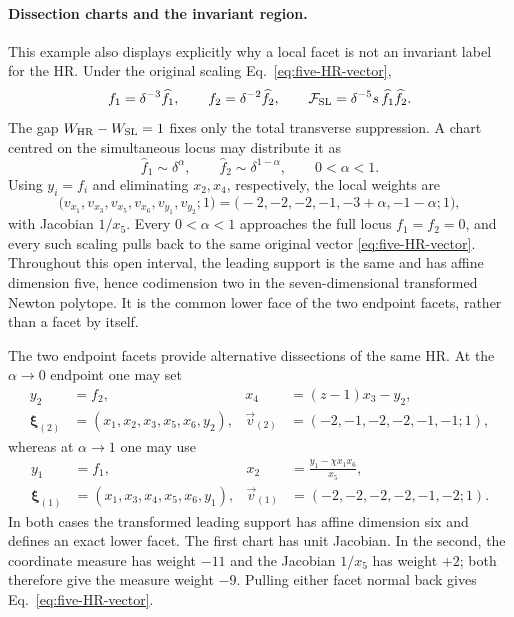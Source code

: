 \documentclass[a4paper,11pt]{article}
\newcommand{\FSL}{\mathcal F_{\rm SL}}
\newcommand{\WSL}{W_{\rm SL}}
\newcommand{\WHR}{W_{\rm HR}}
\begin{document}
\paragraph{Dissection charts and the invariant region.}
\label{sec:five-point-sc-charts}
This example also displays explicitly why a local facet is not an invariant
label for the HR.  Under the original scaling
Eq.~\eqref{eq:five-HR-vector},
\begin{equation}
 f_1=\delta^{-3}\widehat f_1,
 \qquad f_2=\delta^{-2}\widehat f_2,
 \qquad \FSL=\delta^{-5}s\,\widehat f_1\widehat f_2.
 \label{eq:five-sc-normalised-factors}
\end{equation}
The gap \(\WHR-\WSL=1\) fixes only the total transverse suppression.
A chart centred on the simultaneous locus may distribute it as
\begin{equation}
 \widehat f_1\sim\delta^\alpha,
 \qquad \widehat f_2\sim\delta^{1-\alpha},
 \qquad 0<\alpha<1.
 \label{eq:five-sc-dissection-family}
\end{equation}
Using \(y_i=f_i\) and eliminating \(x_2,x_4\), respectively, the local
weights are
\begin{equation}
 \bigl(v_{x_1},v_{x_3},v_{x_5},v_{x_6},v_{y_1},v_{y_2};1\bigr)
 =\bigl(-2,-2,-2,-1,-3+\alpha,-1-\alpha;1\bigr),
 \label{eq:five-sc-centred-chart}
\end{equation}
with Jacobian \(1/x_5\).  Every \(0<\alpha<1\) approaches the full locus
\(f_1=f_2=0\), and every such scaling pulls back to the same original vector
\eqref{eq:five-HR-vector}.  Throughout this open interval, the leading support
is the same and has affine dimension five, hence codimension two in the
seven-dimensional transformed Newton polytope.  It is the common lower face
of the two endpoint facets, rather than a facet by itself.

The two endpoint facets provide alternative dissections of the same HR.  At the
\(\alpha\to0\) endpoint one may set
\begin{equation}
 \begin{aligned}
  y_2&=f_2, & x_4&=(z-1)x_3-y_2,\\
  \boldsymbol\xi_{(2)}&=(x_1,x_2,x_3,x_5,x_6,y_2),&
  \vec v_{(2)}&=(-2,-1,-2,-2,-1,-1;1),
 \end{aligned}
 \label{eq:five-sc-f2-chart}
\end{equation}
whereas at \(\alpha\to1\) one may use
\begin{equation}
 \begin{aligned}
  y_1&=f_1, & x_2&=\frac{y_1-\chi x_1x_6}{x_5},\\
  \boldsymbol\xi_{(1)}&=(x_1,x_3,x_4,x_5,x_6,y_1),&
  \vec v_{(1)}&=(-2,-2,-2,-2,-1,-2;1).
 \end{aligned}
 \label{eq:five-sc-f1-chart}
\end{equation}
In both cases the transformed leading support has affine dimension six and
defines an exact lower facet.  The first chart has unit Jacobian.  In the
second, the coordinate measure has weight \(-11\) and the Jacobian \(1/x_5\)
has weight \(+2\); both therefore give the measure weight \(-9\).  Pulling
either facet normal back gives Eq.~\eqref{eq:five-HR-vector}.
\end{document}
